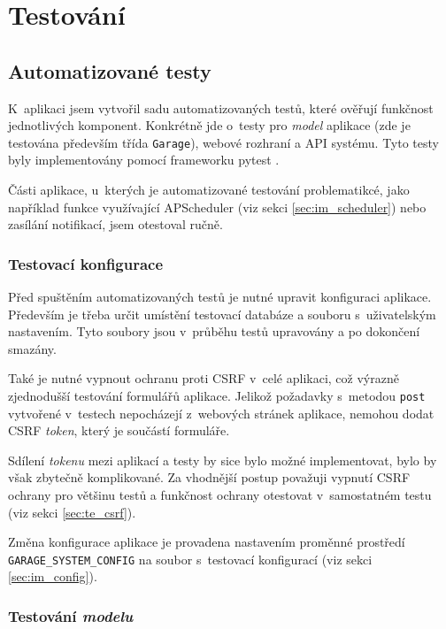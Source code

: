 \chapter{Testování}
\label{sec:te}


\section{Automatizované testy}

K~aplikaci jsem vytvořil sadu automatizovaných testů, které ověřují funkčnost jednotlivých komponent. Konkrétně jde o~testy pro \textit{model} aplikace (zde je testována především třída \texttt{Garage}), webové rozhraní a API systému. Tyto testy byly implementovány pomocí frameworku pytest \cite{pytest}.

Části aplikace, u~kterých je automatizované testování problematikcé, jako například funkce využívající APScheduler (viz sekci \ref{sec:im_scheduler}) nebo zasílání notifikací, jsem otestoval ručně.

\subsection{Testovací konfigurace}

Před spuštěním automatizovaných testů je nutné upravit konfiguraci aplikace. Především je třeba určit umístění testovací databáze a souboru s~uživatelským nastavením. Tyto soubory jsou v~průběhu testů upravovány a po dokončení smazány.

Také je nutné vypnout ochranu proti CSRF v~celé aplikaci, což výrazně zjednodušší testování formulářů aplikace. Jelikož požadavky s~metodou \texttt{post} vytvořené v~testech nepocházejí z~webových stránek aplikace, nemohou dodat CSRF \textit{token}, který je součástí formuláře. 

Sdílení \textit{tokenu} mezi aplikací a testy by sice bylo možné implementovat, bylo by však zbytečně komplikované. Za vhodnější postup považuji vypnutí CSRF ochrany pro většinu testů a funkčnost ochrany otestovat v~samostatném testu (viz sekci \ref{sec:te_csrf}).

Změna konfigurace aplikace je provadena nastavením proměnné prostředí \texttt{GARAGE\_SYSTEM\_CONFIG} na soubor s~testovací konfigurací (viz sekci \ref{sec:im_config}).

\subsection{Testování \textit{modelu}}
\label{sec:te_model}

